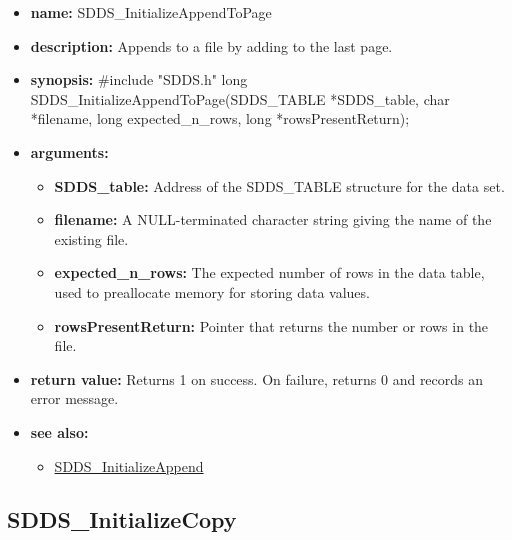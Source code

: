 \documentclass[11pt]{article}
\newcommand{\progref}[1]{\hyperref{SDDS_#1}{{\tt SDDS\_#1} (}{)}{SDDS_#1}}
\begin{document}
\begin{itemize}
\item {\bf name:}\newline
SDDS\_InitializeAppendToPage
\item {\bf description:}\newline
Appends to a file by adding to the last page.
\item {\bf synopsis:} \#include "SDDS.h"\newline
long SDDS\_InitializeAppendToPage(SDDS\_TABLE *SDDS\_table, char *filename, long expected\_n\_rows, long *rowsPresentReturn);
\item {\bf arguments:}
\begin{itemize}
\item {\bf SDDS\_table:} Address of the SDDS\_TABLE structure for the data set.
\item {\bf filename:} A NULL-terminated character string giving the name of the existing file.
\item {\bf expected\_n\_rows:} The expected number of rows in the data table, used to preallocate memory for storing data values.
\item {\bf rowsPresentReturn:} Pointer that returns the number or rows in the file.
\end{itemize}
\item {\bf return value:}\newline
Returns 1 on success. On failure, returns 0 and records an error message.
\item {\bf see also:}
\begin{itemize}
\item \progref{InitializeAppend}
\end{itemize}
\end{itemize}

\subsection{SDDS\_InitializeCopy}
\label{SDDS_InitializeCopy}
\end{document}
